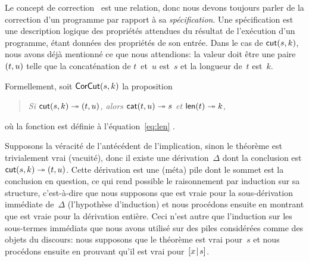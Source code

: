 \label{par:cut_sound}

Le concept de correction~\citep{McCarthy_1962, Floyd_1967, Hoare_1971,
  Dijkstra_1976} est une relation, donc nous devons toujours parler de
la correction d'un programme par rapport à sa
\emph{spécification}. Une spécification est une
description logique des propriétés attendues du résultat de
l'exécution d'un programme, étant données des propriétés de son
entrée. Dans le cas de \(\textsf{cut}(s,k)\), nous avons déjà mentionné
ce que nous attendions: la valeur doit être une paire \(({t},{u})\)
telle que la concaténation de \(t\)~et~\(u\) est~\(s\) et la longueur
de~\(t\) est~\(k\).

Formellement, soit
\(\textsf{CorCut}({s,k})\) la
proposition
\begin{quote}
  \textsl{Si \(\textsf{cut}(s,k) \twoheadrightarrow ({t},{u})\), alors
    \(\textsf{cat}(t,u) \twoheadrightarrow s\) et \(\textsf{len}(t)
    \twoheadrightarrow k\),}
\end{quote}
où la fonction  est définie à
l'équation~\eqref{eq:len} .

Supposons la véracité de l'antécédent de l'implication, sinon le
théorème est trivialement vrai (vacuité), donc il existe une
dérivation~\(\Delta\) dont la conclusion est \(\textsf{cut}(s,k)
\twoheadrightarrow ({t},{u})\). Cette dérivation est une (méta) pile
dont le sommet est la conclusion en question, ce qui rend possible le
raisonnement par induction sur sa structure, c'est-à-dire que nous
supposons que  est vraie pour la sous-dérivation
immédiate de~\(\Delta\) (l'hypothèse d'induction) et nous procédons
ensuite en montrant que  est vraie pour la dérivation
entière. Ceci n'est autre que l'induction sur les sous-termes
immédiats que nous avons utilisé sur des piles considérées comme des
objets du discours: nous supposons que le théorème est vrai pour~\(s\)
et nous procédons ensuite en prouvant qu'il est vrai
pour~\([{x}\!\mid\!{s}]\).

